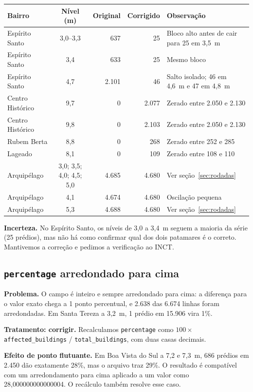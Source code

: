 \documentclass[11pt,a4paper]{article}
\begin{document}
\begin{longtable}{l c r r p{6cm}}
\toprule
Bairro & Nível (m) & Original & Corrigido & Observação\\
\midrule
\endhead
Espírito Santo & 3,0--3,3 & 637 & 25 & Bloco alto antes de cair para 25 em 3,5~m\\
Espírito Santo & 3,4 & 633 & 25 & Mesmo bloco\\
Espírito Santo & 4,7 & 2.101 & 46 & Salto isolado; 46 em 4,6~m e 47 em 4,8~m\\
Centro Histórico & 9,7 & 0 & 2.077 & Zerado entre 2.050 e 2.130\\
Centro Histórico & 9,8 & 0 & 2.103 & Zerado entre 2.050 e 2.130\\
Rubem Berta & 8,8 & 0 & 268 & Zerado entre 252 e 285\\
Lageado & 8,1 & 0 & 109 & Zerado entre 108 e 110\\
Arquipélago & 3,0; 3,5; 4,0; 4,5; 5,0 & 4.685 & 4.680 & Ver seção~\ref{sec:rodadas}\\
Arquipélago & 4,1 & 4.674 & 4.680 & Oscilação pequena\\
Arquipélago & 5,3 & 4.688 & 4.680 & Ver seção~\ref{sec:rodadas}\\
\bottomrule
\end{longtable}

\textbf{Incerteza.} No Espírito Santo, os níveis de 3,0 a 3,4~m seguem a maioria da série (25 prédios), mas não há como confirmar qual dos dois patamares é o correto. Mantivemos a correção e pedimos a verificação ao INCT.

\subsection{\texttt{percentage} arredondado para cima}
\textbf{Problema.} O campo é inteiro e sempre arredondado para cima: a diferença para o valor exato chega a 1 ponto percentual, e 2.638 das 6.674 linhas foram arredondadas. Em Santa Tereza a 3,2~m, 1 prédio em 15.906 vira 1\%.

\textbf{Tratamento: corrigir.} Recalculamos \texttt{percentage} como $100 \times$ \texttt{affected\_buildings} / \texttt{total\_buildings}, com duas casas decimais.

\textbf{Efeito de ponto flutuante.} Em Boa Vista do Sul a 7,2 e 7,3~m, 686 prédios em 2.450 dão exatamente 28\%, mas o arquivo traz 29\%. O resultado é compatível com um arredondamento para cima aplicado a um valor como 28,000000000000004. O recálculo também resolve esse caso.
\end{document}
